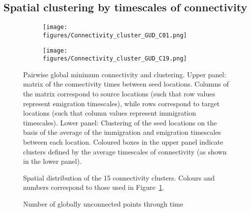 \documentclass[12pt]{article}
\begin{document}
\subsection{Spatial clustering by timescales of connectivity}


\begin{figure}[htp!]
\begin{subfigure}{0.5\textwidth}
\centering
\texttt{[image: figures/Connectivity\_cluster\_GUD\_C01.png]}%
\end{subfigure}
\begin{subfigure}{0.5\textwidth}
\centering
\texttt{[image: figures/Connectivity\_cluster\_GUD\_C19.png]}%
\end{subfigure}
\caption{Pairwise global minimum connectivity and clustering. Upper panel: matrix of the connectivity times between seed locations. Columns of the matrix correspond to source locations (such that row values represent emigration timescales), while rows correspond to target locations (such that column values represent immigration timescales). Lower panel: Clustering of the seed locations on the basis of the average of the immigration and emigration timescales between each location. Coloured boxes in the upper panel indicate clusters defined by the average timescales of connectivity (as shown in the lower panel).}
\label{connectivity_matrices}
\end{figure}



\begin{figure}[htp!]
\begin{subfigure}{0.5\textwidth}
\centering
\end{subfigure}
\begin{subfigure}{0.5\textwidth}
\centering
\end{subfigure}
\caption{Spatial distribution of the 15 connectivity clusters. Colours and numbers correspond to those used in Figure~\ref{connectivity_matrices}.}
\label{Connectivity_maps}
\end{figure}

\begin{figure}[htp!]
\centering
{}%
\caption{Number of globally unconnected points through time}
\label{Connectivity_maps}
\end{figure}
\end{document}
